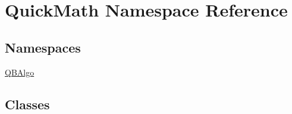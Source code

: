 \hypertarget{namespaceQuickMath}{}\section{Quick\+Math Namespace Reference}
\label{namespaceQuickMath}
\subsection*{Namespaces}
\begin{DoxyCompactItemize}
\item 
 \hyperlink{namespaceQuickMath_1_1QBAlgo}{Q\+B\+Algo}
\end{DoxyCompactItemize}
\subsection*{Classes}
